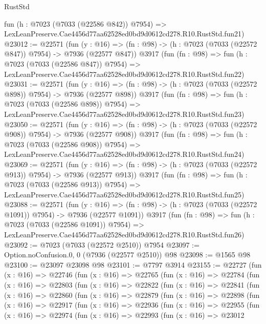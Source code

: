 \begin{lexlean}{RustStd}
\begin{coremodule}
    fun (h : @7023 (@7033 (@22586 @842)) @7954) =>
    LexLeanPreserve.Cae4456d77aa62528ed0bd9d0612cd278.R10.RustStd.fun21)
@23012 := @22571
    (fun (y : @16) => (fn : @98) -> (h : @7023 (@7033 (@22572 @847)) @7954) -> @7936 (@22577 @847))
    @3917
    (fun (fn : @98) =>
    fun (h : @7023 (@7033 (@22586 @847)) @7954) =>
    LexLeanPreserve.Cae4456d77aa62528ed0bd9d0612cd278.R10.RustStd.fun22)
@23031 := @22571
    (fun (y : @16) => (fn : @98) -> (h : @7023 (@7033 (@22572 @898)) @7954) -> @7936 (@22577 @898))
    @3917
    (fun (fn : @98) =>
    fun (h : @7023 (@7033 (@22586 @898)) @7954) =>
    LexLeanPreserve.Cae4456d77aa62528ed0bd9d0612cd278.R10.RustStd.fun23)
@23050 := @22571
    (fun (y : @16) => (fn : @98) -> (h : @7023 (@7033 (@22572 @908)) @7954) -> @7936 (@22577 @908))
    @3917
    (fun (fn : @98) =>
    fun (h : @7023 (@7033 (@22586 @908)) @7954) =>
    LexLeanPreserve.Cae4456d77aa62528ed0bd9d0612cd278.R10.RustStd.fun24)
@23069 := @22571
    (fun (y : @16) => (fn : @98) -> (h : @7023 (@7033 (@22572 @913)) @7954) -> @7936 (@22577 @913))
    @3917
    (fun (fn : @98) =>
    fun (h : @7023 (@7033 (@22586 @913)) @7954) =>
    LexLeanPreserve.Cae4456d77aa62528ed0bd9d0612cd278.R10.RustStd.fun25)
@23088 := @22571
    (fun (y : @16) =>
    (fn : @98) -> (h : @7023 (@7033 (@22572 @1091)) @7954) -> @7936 (@22577 @1091))
    @3917
    (fun (fn : @98) =>
    fun (h : @7023 (@7033 (@22586 @1091)) @7954) =>
    LexLeanPreserve.Cae4456d77aa62528ed0bd9d0612cd278.R10.RustStd.fun26)
@23092 := @7023 (@7033 (@22572 @2510)) @7954
@23097 := Option.noConfusion.{0, 0} (@7936 (@22577 @2510)) @98
@23098 := @1565 @98
@23100 := @23097 @23098 @98
@23101 := @7797 @3914
@23155 := @22727
    (fun (x : @16) =>
    @22746
      (fun (x : @16) =>
      @22765
        (fun (x : @16) =>
        @22784
          (fun (x : @16) =>
          @22803
            (fun (x : @16) =>
            @22822
              (fun (x : @16) =>
              @22841
                (fun (x : @16) =>
                @22860
                  (fun (x : @16) =>
                  @22879
                    (fun (x : @16) =>
                    @22898
                      (fun (x : @16) =>
                      @22917
                        (fun (x : @16) =>
                        @22936
                          (fun (x : @16) =>
                          @22955
                            (fun (x : @16) =>
                            @22974
                              (fun (x : @16) =>
                              @22993
                                (fun (x : @16) =>
                                @23012

\end{coremodule}
\end{lexlean}
